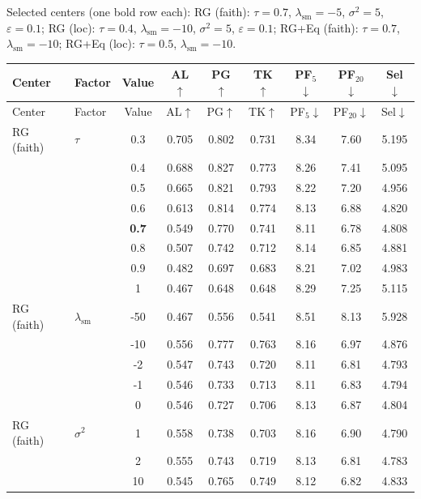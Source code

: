 \noindent Selected centers (one bold row each): RG (faith): $\tau{=}0.7$, $\lambda_{\mathrm{sm}}{=}{-}5$, $\sigma^2{=}5$, $\varepsilon{=}0.1$; RG (loc): $\tau{=}0.4$, $\lambda_{\mathrm{sm}}{=}{-}10$, $\sigma^2{=}5$, $\varepsilon{=}0.1$; RG+Eq (faith): $\tau{=}0.7$, $\lambda_{\mathrm{sm}}{=}{-}10$; RG+Eq (loc): $\tau{=}0.5$, $\lambda_{\mathrm{sm}}{=}{-}10$.\par
\begin{longtable}{@{}l l c c c c c c c@{}}
\toprule
Center & Factor & Value & AL$\uparrow$ & PG$\uparrow$ & TK$\uparrow$ & PF$_5$$\downarrow$ & PF$_{20}$$\downarrow$ & Sel$\downarrow$ \\
\midrule
\endfirsthead
\toprule
Center & Factor & Value & AL$\uparrow$ & PG$\uparrow$ & TK$\uparrow$ & PF$_5$$\downarrow$ & PF$_{20}$$\downarrow$ & Sel$\downarrow$ \\
\midrule
\endhead
\bottomrule
\endlastfoot
RG (faith) & $\tau$ & 0.3 & 0.705 & 0.802 & 0.731 & 8.34 & 7.60 & 5.195 \\
 &  & 0.4 & 0.688 & 0.827 & 0.773 & 8.26 & 7.41 & 5.095 \\
 &  & 0.5 & 0.665 & 0.821 & 0.793 & 8.22 & 7.20 & 4.956 \\
 &  & 0.6 & 0.613 & 0.814 & 0.774 & 8.13 & 6.88 & 4.820 \\
 &  & \textbf{0.7} & 0.549 & 0.770 & 0.741 & 8.11 & 6.78 & 4.808 \\
 &  & 0.8 & 0.507 & 0.742 & 0.712 & 8.14 & 6.85 & 4.881 \\
 &  & 0.9 & 0.482 & 0.697 & 0.683 & 8.21 & 7.02 & 4.983 \\
 &  & 1 & 0.467 & 0.648 & 0.648 & 8.29 & 7.25 & 5.115 \\
\midrule
RG (faith) & $\lambda_{\mathrm{sm}}$ & {-}50 & 0.467 & 0.556 & 0.541 & 8.51 & 8.13 & 5.928 \\
 &  & {-}10 & 0.556 & 0.777 & 0.763 & 8.16 & 6.97 & 4.876 \\
 &  & {-}2 & 0.547 & 0.743 & 0.720 & 8.11 & 6.81 & 4.793 \\
 &  & {-}1 & 0.546 & 0.733 & 0.713 & 8.11 & 6.83 & 4.794 \\
 &  & 0 & 0.546 & 0.727 & 0.706 & 8.13 & 6.87 & 4.804 \\
\midrule
RG (faith) & $\sigma^2$ & 1 & 0.558 & 0.738 & 0.703 & 8.16 & 6.90 & 4.790 \\
 &  & 2 & 0.555 & 0.743 & 0.719 & 8.13 & 6.81 & 4.783 \\
 &  & 10 & 0.545 & 0.765 & 0.749 & 8.12 & 6.82 & 4.833 \\
\midrule

\end{longtable}
